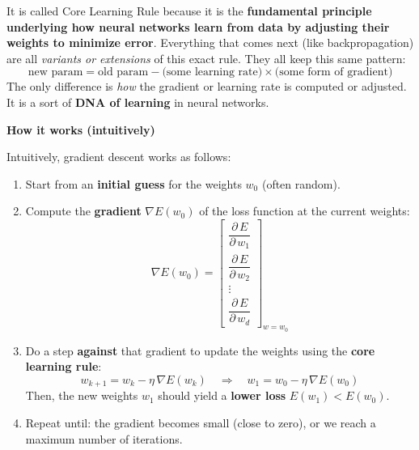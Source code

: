 \begin{definitionbox}
    It is called Core Learning Rule because it is the \textbf{fundamental principle underlying how neural networks learn from data by adjusting their weights to minimize error}. Everything that comes next (like backpropagation) are all \emph{variants or extensions} of this exact rule. They all keep this same pattern:
    \begin{equation*}
        \text{new param} = \text{old param} - \text{(some learning rate)} \times \text{(some form of gradient)}
    \end{equation*}
    The only difference is \emph{how} the gradient or learning rate is computed or adjusted. It is a sort of \textbf{DNA of learning} in neural networks.
\end{definitionbox}

\begin{flushleft}
    \textcolor{Green3}{ \textbf{How it works (intuitively)}}
\end{flushleft}
Intuitively, gradient descent works as follows:
\begin{enumerate}
    \item Start from an \textbf{initial guess} for the weights $w_{0}$ (often random).
    \item Compute the \textbf{gradient} $\nabla E(w_{0})$ of the loss function at the current weights:
    \begin{equation*}
        \nabla E(w_{0}) = \begin{bmatrix}
            \dfrac{\partial \, E}{\partial \, w_{1}} \\[1.2em]
            \dfrac{\partial \, E}{\partial \, w_{2}} \\[1.2em]
            \vdots \\
            \dfrac{\partial \, E}{\partial \, w_{d}}
        \end{bmatrix}_{w = w_{0}}
    \end{equation*}

    \item Do a step \textbf{against} that gradient to update the weights using the \textbf{core learning rule}:
    \begin{equation*}
        w_{k+1} = w_{k} - \eta \,\nabla E(w_{k})
        \quad \Rightarrow \quad
        w_{1} = w_{0} - \eta \,\nabla E(w_{0})
    \end{equation*}
    Then, the new weights $w_{1}$ should yield a \textbf{lower loss} $E(w_{1}) < E(w_{0})$.
    \item Repeat until: the gradient becomes small (close to zero), or we reach a maximum number of iterations.
\end{enumerate}


